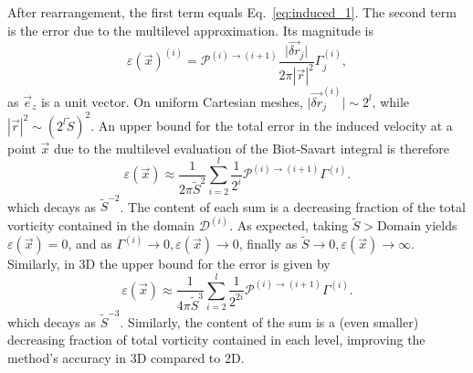 \documentclass[11pt]{article}
\begin{document}
After rearrangement, the first term equals Eq.~\ref{eq:induced_1}. The second term is the error due to the multilevel approximation. Its magnitude is
\begin{equation}
    \varepsilon(\vec{x})^{(i)} = \mathcal{P}^{(i)\to(i+1)}\frac{\vert\vec{\delta r}_j\vert}{2\pi|\vec{r}|^2}\Gamma^{(i)}_j,
\end{equation}
as $\vec{e}_z$ is a unit vector. On uniform Cartesian meshes, $\vert\vec{\delta r}_j^{(i)}\vert\sim2^{l}$, while $|\vec{r}|^2 \sim (2^l\tilde{S})^2$. An upper bound for the total error in the induced velocity at a point $\vec x$ due to the multilevel evaluation of the Biot-Savart integral is therefore
\begin{equation}
    \varepsilon(\vec{x}) \approx \frac{1}{2\pi\tilde{S}^2}\sum_{i=2}^{l}\frac{1}{2^i}\mathcal{P}^{(i)\to(i+1)}
    \Gamma^{(i)}.
\end{equation}
which decays as $\tilde{S}^{-2}$. The content of each sum is a decreasing fraction of the total vorticity contained in the domain $\mathcal{D}^{(i)}$. As expected, taking $\tilde{S}>\text{Domain}$ yields $\varepsilon(\vec{x}) = 0$, and as $\Gamma^{(i)} \to 0, \varepsilon(\vec{x})\to 0$, finally as $\tilde{S}\to0, \varepsilon(\vec{x}) \to \infty$. Similarly, in 3D the upper bound for the error is given by
\begin{equation}
    \varepsilon(\vec{x}) \approx \frac{1}{4\pi\tilde{S}^3}\sum_{i=2}^{l}\frac{1}{2^{2i}}\mathcal{P}^{(i)\to(i+1)}
    \Gamma^{(i)}.
\end{equation}
which decays as $\tilde{S}^{-3}$. Similarly, the content of the sum is a (even smaller) decreasing fraction of total vorticity contained in each level, improving the method's accuracy in 3D compared to 2D.


\end{document}
